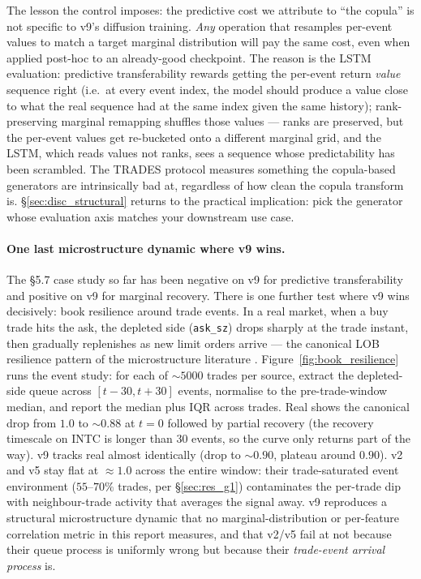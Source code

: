 \documentclass[journal]{IEEEtran}
\theoremstyle{definition}   %
\begin{document}
The lesson the control imposes: the predictive cost we attribute to
``the copula'' is not specific to v9's diffusion training. \emph{Any}
operation that resamples per-event values to match a target marginal
distribution will pay the same cost, even when applied post-hoc to
an already-good checkpoint. The reason is the LSTM evaluation:
predictive transferability rewards getting the per-event return
\emph{value} sequence right (i.e.\ at every event index, the model
should produce a value close to what the real sequence had at
the same index given the same history); rank-preserving marginal
remapping shuffles those values --- ranks are preserved, but the
per-event values get re-bucketed onto a different marginal grid,
and the LSTM, which reads values not ranks, sees a sequence whose
predictability has been scrambled. The TRADES protocol
\cite{berti2025trades} measures something the copula-based
generators are intrinsically bad at, regardless of how clean the
copula transform is. \S\ref{sec:disc_structural} returns to the
practical implication: pick the generator whose evaluation axis
matches your downstream use case.

\paragraph{One last microstructure dynamic where v9 wins.}
The §5.7 case study so far has been negative on v9 for predictive
transferability and positive on v9 for marginal recovery. There is
one further test where v9 wins decisively: book resilience around
trade events. In a real market, when a buy trade hits the ask, the
depleted side (\texttt{ask\_sz}) drops sharply at the trade
instant, then gradually replenishes as new limit orders arrive ---
the canonical LOB resilience pattern of the microstructure
literature \cite{bouchaud2002statistical}. Figure~\ref{fig:book_resilience}
runs the event study: for each of $\sim 5000$ trades per source,
extract the depleted-side queue across $[t-30, t+30]$ events,
normalise to the pre-trade-window median, and report the median
plus IQR across trades. Real shows the canonical drop from $1.0$ to
$\sim 0.88$ at $t=0$ followed by partial recovery (the recovery
timescale on INTC is longer than $30$ events, so the curve only
returns part of the way). v9 tracks real almost identically (drop
to $\sim 0.90$, plateau around $0.90$). v2 and v5 stay flat at
$\approx 1.0$ across the entire window: their trade-saturated
event environment ($55$--$70\%$ trades, per \S\ref{sec:res_g1})
contaminates the per-trade dip with neighbour-trade activity that
averages the signal away. v9 reproduces a structural microstructure
dynamic that no marginal-distribution or per-feature correlation
metric in this report measures, and that v2/v5 fail at not because
their queue process is uniformly wrong but because their
\emph{trade-event arrival process} is.
\end{document}
